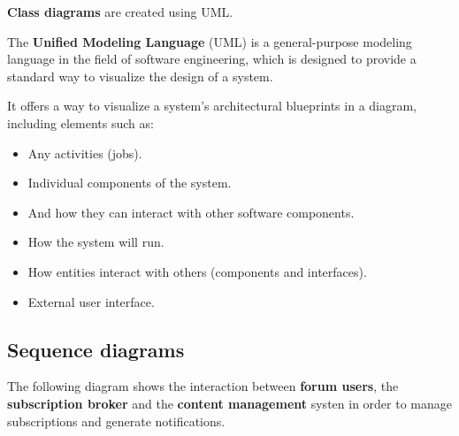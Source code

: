\documentclass[12pt]{report}
\renewcommand\emph{\textbf}
\begin{document}
                \emph{Class diagrams} are created using UML.

                The \emph{Unified Modeling Language} (UML) is a general-purpose modeling language in the field of software engineering, which is designed to provide a standard way to visualize the design of a system.

                It offers a way to visualize a system's architectural blueprints in a diagram, including elements such as:

                \begin{itemize}
                    \item Any activities (jobs).
                    \item Individual components of the system.
                    \item And how they can interact with other software components.
                    \item How the system will run.
                    \item How entities interact with others (components and interfaces).
                    \item External user interface.
                \end{itemize}


                \newpage


                \newpage
                \newpage

            \subsection{Sequence diagrams}

                The following diagram shows the interaction between \emph{forum users}, the \emph{subscription broker} and the \emph{content management} systen in order to manage subscriptions and generate notifications.
\end{document}
